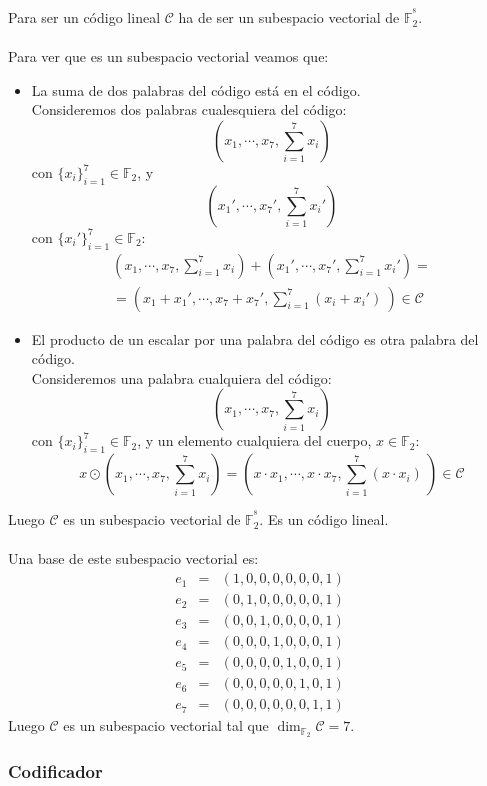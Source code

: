 Para ser un c\'odigo lineal $\mathcal{C}$ ha de ser un subespacio vectorial
de $\mathbb{F}^{^8}_2$.\\ \\
%
Para ver que es un subespacio vectorial veamos que:
\begin{itemize}
\item La suma de dos palabras del c\'odigo est\'a en el c\'odigo.\\

Consideremos dos palabras cualesquiera del c\'odigo:
$$(x_1,\cdots,x_7,\sum_{i=1}^7 x_i )$$ con $\{x_i\}_{i=1}^7\in \mathbb{F}_2$, 
y $$(x_1',\cdots,x_7',\sum_{i=1}^7 x_i' )$$ con $\{x_i'\}_{i=1}^7\in
\mathbb{F}_2$:
\begin{eqnarray*}
(x_1,\cdots,x_7,\sum_{i=1}^7 x_i)+(x_1',\cdots,x_7',\sum_{i=1}^7 x_i')=\\
= (x_1+x_1',\cdots,x_7+x_7',\sum_{i=1}^7 (x_i+x_i')\ )\in \mathcal{C}
\end{eqnarray*}
%
\newpage
%
\item El producto de un escalar por una palabra del c\'odigo es otra palabra 
del c\'odigo.\\ 

Consideremos una palabra cualquiera del c\'odigo:
$$(x_1,\cdots,x_7,\sum_{i=1}^7 x_i)$$
con $\{x_i\}_{i=1}^7\in \mathbb{F}_2$, y un elemento cualquiera del cuerpo,
$x\in \mathbb{F}_2$:
\begin{displaymath}
x\odot (x_1,\cdots,x_7,\sum_{i=1}^7 x_i) = (x\cdot x_1,\cdots, x\cdot x_7,
\sum_{i=1}^7 (x\cdot x_i)\ )\in \mathcal{C}
\end{displaymath}
\end{itemize}
Luego $\mathcal{C}$ es un subespacio vectorial de $\mathbb{F}^{^8}_2$. Es
un c\'odigo lineal.\\ \\
%
Una base de este subespacio vectorial es:
\begin{eqnarray*}
e_1&=&(1,0,0,0,0,0,0,1)\\
e_2&=&(0,1,0,0,0,0,0,1)\\
e_3&=&(0,0,1,0,0,0,0,1)\\
e_4&=&(0,0,0,1,0,0,0,1)\\
e_5&=&(0,0,0,0,1,0,0,1)\\
e_6&=&(0,0,0,0,0,1,0,1)\\
e_7&=&(0,0,0,0,0,0,1,1)
\end{eqnarray*}
Luego $\mathcal{C}$ es un subespacio vectorial tal que
$\dim_{\mathbb{F}_2} \mathcal{C}=7$.

\subsubsection{Codificador}


